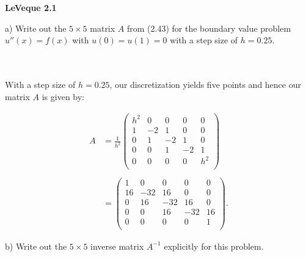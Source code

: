 \textbf{LeVeque 2.1} 

a) Write out the $5 \times 5$ matrix $A$ from (2.43) for the boundary value problem \linebreak $u''(x) = f(x)$ with 
   $u(0) = u(1) = 0$ with a step size of $h = 0.25$.

\begin{solution}\ \\\\
    With a step size of $h = 0.25$, our discretization yields five points and hence our matrix $A$ is given by:

    \begin{align*}
        A &= \frac{1}{h^2}
        \begin{pmatrix}
         h^2 &  0 &  0 &  0 &   0 \\
           1 & -2 &  1 &  0 &   0 \\
           0 &  1 & -2 &  1 &   0 \\
           0 &  0 &  1 & -2 &   1 \\
           0 &  0 &  0 &  0 & h^2 \\
        \end{pmatrix} \\\\
        &= 
        \begin{pmatrix}
             1 &   0 &   0  &   0 &  0 \\
            16 & -32 &  16  &   0 &  0 \\
             0 &  16 & -32  &  16 &  0 \\
             0 &   0 &  16  & -32 & 16 \\
             0 &   0 &   0  &   0 &  1 \\
        \end{pmatrix}.
    \end{align*}
\end{solution}

\pagebreak
b) Write out the $5 \times 5$ inverse matrix $A^{-1}$ explicitly for this problem.

